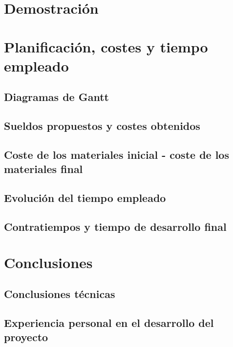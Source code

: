 \chapter{Demostración}

\chapter{Planificación, costes y tiempo empleado}

\section{Diagramas de Gantt}

\section{Sueldos propuestos y costes obtenidos}

\section{Coste de los materiales inicial - coste de los materiales final}

\section{Evolución del tiempo empleado}

\section{Contratiempos y tiempo de desarrollo final}


\chapter{Conclusiones}

\section{Conclusiones técnicas}

\section{Experiencia personal en el desarrollo del proyecto}


